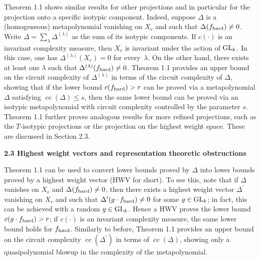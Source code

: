 Theorem 1.1 shows similar results for other projections and in particular for the projection onto a specific isotypic component. Indeed, suppose $\Delta$ is a (homogeneous) metapolynomial vanishing on $X_{r}$ and such that $\Delta(f_{\textup{hard}})\neq 0$. Write $\Delta=\sum_{\lambda}\Delta^{(\lambda)}$ as the sum of its isotypic components. If $c(\cdot)$ is an invariant complexity measure, then $X_{r}$ is invariant under the action of $\textnormal{GL}_{k}$. In this case, one has $\Delta^{(\lambda)}(X_{r})=0$ for every $\lambda$. On the other hand, there exists at least one $\lambda$ such that $\Delta^{(\lambda)}(f_{\textup{hard}})\neq 0$. Theorem 1.1 provides an upper bound on the circuit complexity of $\Delta^{(\lambda)}$ in terms of the circuit complexity of $\Delta$, showing that if the lower bound $c(f_{\textup{hard}})>r$ can be proved via a metapolynomial $\Delta$ satisfying $\operatorname{cc}(\Delta)\leq s$, then the same lower bound can be proved via an isotypic metapolynomial with circuit complexity controlled by the parameter $s$. Theorem 1.1 further proves analogous results for more refined projections, such as the $T$-isotypic projections or the projection on the highest weight space. These are discussed in Section 2.3.






\par\medskip\noindent\textbf{2.3 Highest weight vectors and representation theoretic obstructions}\par




Theorem 1.1 can be used to convert lower bounds proved by $\Delta$ into lower bounds proved by a highest weight vector (HWV for short). To see this, note that if $\Delta$ vanishes on $X_{r}$ and $\Delta(f_{\textup{hard}})\neq 0$, then there exists a highest weight vector $\Delta^{\prime}$ vanishing on $X_{r}$ and such that $\Delta^{\prime}(g\cdot f_{\textup{hard}})\neq 0$ for some $g\in\textnormal{GL}_{k}$; in fact, this can be achieved with a random $g\in\textnormal{GL}_{k}$.
Hence a HWV proves the lower bound $c(g\cdot f_{{\textup{hard}}})>r$; if $c(\cdot)$ is an invariant complexity measure, the same lower bound holds for $f_{{\textup{hard}}}$. Similarly to before, Theorem 1.1 provides an upper bound on the circuit complexity $\operatorname{cc}(\Delta^{\prime})$ in terms of $\operatorname{cc}(\Delta)$, showing only a quasipolynomial blowup in the complexity of the metapolynomial.





